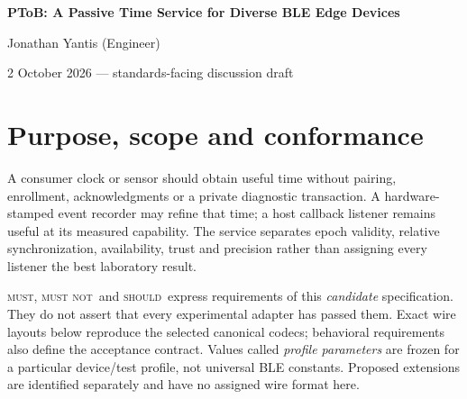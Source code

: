 \documentclass[11pt,letterpaper]{article}
\newcommand{\must}{\textsc{must}}
\newcommand{\mustnot}{\textsc{must not}}
\newcommand{\should}{\textsc{should}}
\begin{document}
\thispagestyle{plain}
\begin{center}
{\LARGE\bfseries PToB: A Passive Time Service for Diverse BLE Edge Devices\par}
\vspace{7pt}{\large Candidate protocol specification and profile proposal\par}
\vspace{9pt}Jonathan Yantis (Engineer)\par
{\small 2 October 2026 --- standards-facing discussion draft}
\end{center}
\begin{abstract}
Precision Time over BLE (PToB) proposes public, passive time acquisition for devices with different timestamp, computation and power capabilities. Coarse UTC, lightweight original-transmit correction and a physical-event precision stream are separately decodable services. Enhanced diagnostics, elections and relay roles require separate authorization. This draft specifies advertising envelopes, header bits, field widths, timestamp references, physical-copy matching, erasure recovery, freshness, clock publication, authority admission and bounded mesh forwarding. Legacy advertising on channels 37, 38 and 39 is the selected transport. Numerical precision and power are device-profile results, not properties inferred from a packet format. Prospective fixed-edge calibration demonstrates tens-of-nanoseconds RMS in warm PPS-shadow validation; external delivered output, transparent residence correction and coordinated low-duty operation remain qualification goals.
\end{abstract}

\section{Purpose, scope and conformance}
A consumer clock or sensor should obtain useful time without pairing, enrollment, acknowledgments or a private diagnostic transaction. A hardware-stamped event recorder may refine that time; a host callback listener remains useful at its measured capability. The service separates epoch validity, relative synchronization, availability, trust and precision rather than assigning every listener the best laboratory result.

\must, \mustnot\ and \should\ express requirements of this \emph{candidate} specification. They do not assert that every experimental adapter has passed them. Exact wire layouts below reproduce the selected canonical codecs; behavioral requirements also define the acceptance contract. Values called \emph{profile parameters} are frozen for a particular device/test profile, not universal BLE constants. Proposed extensions are identified separately and have no assigned wire format here.
\end{document}
